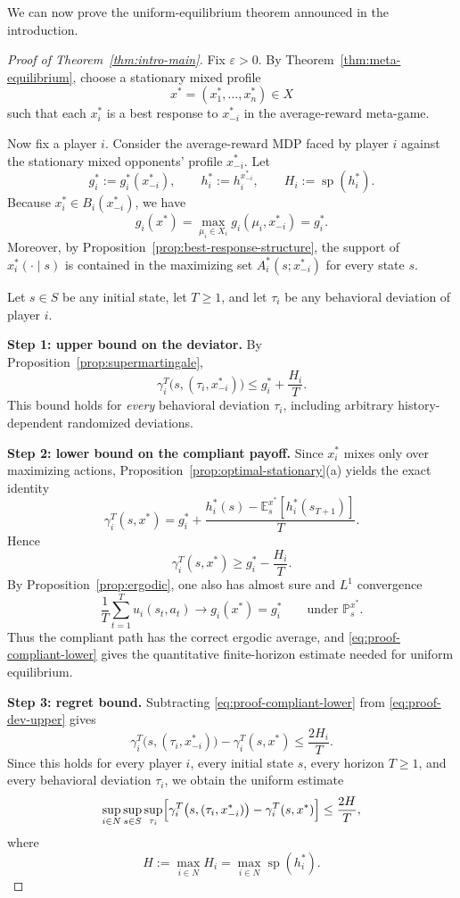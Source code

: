 \documentclass[11pt]{article}
\theoremstyle{definition}
\newcommand{\E}{\mathbb{E}}
\newcommand{\Prob}{\mathbb{P}}
\newcommand{\1}{\mathbf{1}}
\DeclareMathOperator{\spn}{sp}
\begin{document}
We can now prove the uniform-equilibrium theorem announced in the introduction.

\begin{proof}[Proof of Theorem~\ref{thm:intro-main}]
Fix $\varepsilon>0$. By Theorem~\ref{thm:meta-equilibrium}, choose a stationary mixed profile
\[
x^*=(x_1^*,\dots,x_n^*)\in X
\]
such that each $x_i^*$ is a best response to $x_{-i}^*$ in the average-reward meta-game.

Now fix a player $i$. Consider the average-reward MDP faced by player $i$ against the stationary mixed opponents' profile $x_{-i}^*$. Let
\[
g_i^*:=g_i^*(x_{-i}^*),\qquad h_i^*:=h_i^{x_{-i}^*},\qquad H_i:=\spn(h_i^*).
\]
Because $x_i^*\in B_i(x_{-i}^*)$, we have
\[
g_i(x^*)=\max_{\mu_i\in X_i}g_i(\mu_i,x_{-i}^*)=g_i^*.
\]
Moreover, by Proposition~\ref{prop:best-response-structure}, the support of $x_i^*(\cdot\mid s)$ is contained in the maximizing set $A_i^*(s;x_{-i}^*)$ for every state $s$.

Let $s\in S$ be any initial state, let $T\ge1$, and let $\tau_i$ be any behavioral deviation of player $i$.

\smallskip
\noindent
\textbf{Step 1: upper bound on the deviator.}
By Proposition~\ref{prop:supermartingale},
\begin{equation}\label{eq:proof-dev-upper}
\gamma_i^T\bigl(s,(\tau_i,x_{-i}^*)\bigr)\le g_i^*+\frac{H_i}{T}.
\end{equation}
This bound holds for \emph{every} behavioral deviation $\tau_i$, including arbitrary history-dependent randomized deviations.

\smallskip
\noindent
\textbf{Step 2: lower bound on the compliant payoff.}
Since $x_i^*$ mixes only over maximizing actions, Proposition~\ref{prop:optimal-stationary}(a) yields the exact identity
\[
\gamma_i^T(s,x^*)=g_i^*+\frac{h_i^*(s)-\E_s^{x^*}[h_i^*(s_{T+1})]}{T}.
\]
Hence
\begin{equation}\label{eq:proof-compliant-lower}
\gamma_i^T(s,x^*)\ge g_i^* - \frac{H_i}{T}.
\end{equation}
By Proposition~\ref{prop:ergodic}, one also has almost sure and $L^1$ convergence
\[
\frac1T\sum_{t=1}^{T}u_i(s_t,a_t)\longrightarrow g_i(x^*)=g_i^*
\qquad\text{under }\Prob_s^{x^*}.
\]
Thus the compliant path has the correct ergodic average, and \eqref{eq:proof-compliant-lower} gives the quantitative finite-horizon estimate needed for uniform equilibrium.

\smallskip
\noindent
\textbf{Step 3: regret bound.}
Subtracting \eqref{eq:proof-compliant-lower} from \eqref{eq:proof-dev-upper} gives
\[
\gamma_i^T\bigl(s,(\tau_i,x_{-i}^*)\bigr)-\gamma_i^T(s,x^*)\le \frac{2H_i}{T}.
\]
Since this holds for every player $i$, every initial state $s$, every horizon $T\ge1$, and every behavioral deviation $\tau_i$, we obtain the uniform estimate
\[
\sup_{i\in N}\sup_{s\in S}\sup_{\tau_i}\Bigl[\gamma_i^T\bigl(s,(\tau_i,x_{-i}^*)\bigr)-\gamma_i^T(s,x^*)\Bigr]
\le \frac{2H}{T},
\]
where
\[
H:=\max_{i\in N}H_i=\max_{i\in N}\spn(h_i^*).
\]


\end{proof}
\end{document}

